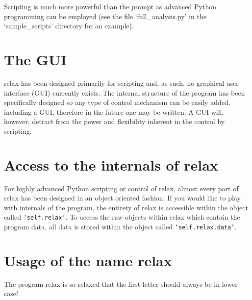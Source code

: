 Scripting is much more powerful than the prompt as advanced Python programming can be employed (see the file `full\_analysis.py' in the `sample\_scripts' directory for an example).




\section{The GUI}

relax has been designed primarily for scripting and, as such, no graphical user interface (GUI) currently exists.  The internal structure of the program has been specifically designed so any type of control mechanism can be easily added, including a GUI, therefore in the future one may be written.  A GUI will, however, detract from the power and flexibility inherent in the control by scripting.




\section{Access to the internals of relax}

For highly advanced Python scripting or control of relax, almost every part of relax has been designed in an object oriented fashion.  If you would like to play with internals of the program, the entirety of relax is accessible within the object called \texttt{`self.relax'}.  To access the raw objects within relax which contain the program data, all data is stored within the object called \texttt{`self.relax.data'}.





\section{Usage of the name relax}

The program relax is so relaxed that the first letter should always be in lower case!

